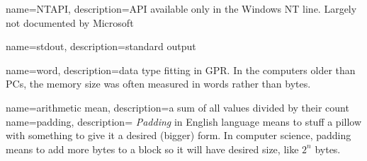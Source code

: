 {
  name=NTAPI,
  description={\ac{API} available only in the Windows NT line.  Largely not documented by Microsoft}
}

{
  name=stdout,
  description={standard output}
}

{
  name=word,
  description={data type fitting in \ac{GPR}.
  In the computers older than PCs, 
  the memory size was often measured in words rather than bytes.}
}

{
  name=arithmetic mean,
  description={a sum of all values divided by their count}
}
{
  name=padding,
  description={
  \emph{Padding} in English language means to stuff a pillow with something
  to give it a desired (bigger) form.
  In computer science, padding means to add more bytes to a block so it will have desired size, like $2^n$ bytes.}
}

